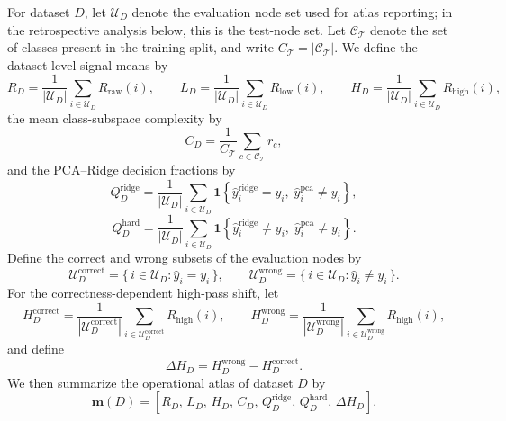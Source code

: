 \documentclass{article}
\newcommand{\Train}{\mathcal{T}}
\newcommand{\Eval}{\mathcal{U}}
\newcommand{\Rraw}{R_{\mathrm{raw}}}
\newcommand{\Rlow}{R_{\mathrm{low}}}
\newcommand{\Rhigh}{R_{\mathrm{high}}}
\begin{document}
For dataset $D$, let $\Eval_D$ denote the evaluation node set used for atlas
reporting; in the retrospective analysis below, this is the test-node set.
Let $\mathcal{C}_{\Train}$ denote the set of classes present in the training
split, and write $C_{\Train}=|\mathcal{C}_{\Train}|$. We define the
dataset-level signal means by
\begin{equation}
R_D
=
\frac{1}{|\Eval_D|}
\sum_{i\in\Eval_D}\Rraw(i),
\qquad
L_D
=
\frac{1}{|\Eval_D|}
\sum_{i\in\Eval_D}\Rlow(i),
\qquad
H_D
=
\frac{1}{|\Eval_D|}
\sum_{i\in\Eval_D}\Rhigh(i),
\label{eq:dataset-signal-means}
\end{equation}
the mean class-subspace complexity by
\begin{equation}
C_D
=
\frac{1}{C_{\Train}}
\sum_{c\in\mathcal{C}_{\Train}} r_c,
\label{eq:dataset-complexity}
\end{equation}
and the PCA--Ridge decision fractions by
\begin{equation}
Q^{\mathrm{ridge}}_D
=
\frac{1}{|\Eval_D|}
\sum_{i\in\Eval_D}
\mathbf{1}\!\left\{
\hat y_i^{\mathrm{ridge}}=y_i,\;
\hat y_i^{\mathrm{pca}}\neq y_i
\right\},
\label{eq:ridge-only-fraction}
\end{equation}
\begin{equation}
Q^{\mathrm{hard}}_D
=
\frac{1}{|\Eval_D|}
\sum_{i\in\Eval_D}
\mathbf{1}\!\left\{
\hat y_i^{\mathrm{ridge}}\neq y_i,\;
\hat y_i^{\mathrm{pca}}\neq y_i
\right\}.
\label{eq:hard-fraction}
\end{equation}
Define the correct and wrong subsets of the evaluation nodes by
\begin{equation}
\Eval_D^{\mathrm{correct}}
=
\{\,i\in\Eval_D:\hat y_i=y_i\,\},
\qquad
\Eval_D^{\mathrm{wrong}}
=
\{\,i\in\Eval_D:\hat y_i\neq y_i\,\}.
\label{eq:correct-wrong-sets}
\end{equation}
For the correctness-dependent high-pass shift, let
\begin{equation}
H_D^{\mathrm{correct}}
=
\frac{1}{|\Eval_D^{\mathrm{correct}}|}
\sum_{i\in\Eval_D^{\mathrm{correct}}}\Rhigh(i),
\qquad
H_D^{\mathrm{wrong}}
=
\frac{1}{|\Eval_D^{\mathrm{wrong}}|}
\sum_{i\in\Eval_D^{\mathrm{wrong}}}\Rhigh(i),
\label{eq:correct-wrong-high}
\end{equation}
and define
\begin{equation}
\Delta H_D
=
H_D^{\mathrm{wrong}}
-
H_D^{\mathrm{correct}}.
\label{eq:highpass-shift}
\end{equation}
We then summarize the operational atlas of dataset $D$ by
\begin{equation}
\mathbf{m}(D)
=
\left[
R_D,\,
L_D,\,
H_D,\,
C_D,\,
Q^{\mathrm{ridge}}_D,\,
Q^{\mathrm{hard}}_D,\,
\Delta H_D
\right].
\label{eq:atlas-fingerprint}
\end{equation}
\end{document}
